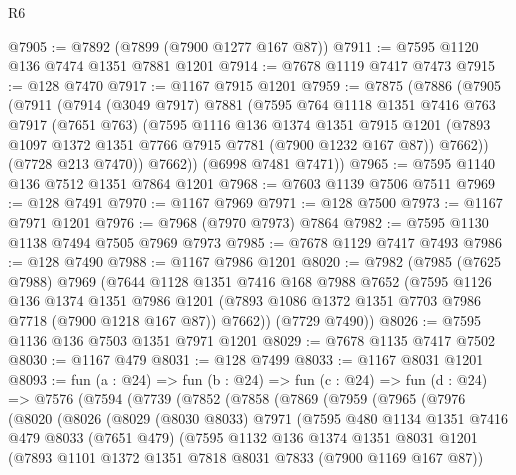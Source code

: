 \begin{lexlean}{R6}
\begin{coremodule}
@7905 := @7892 (@7899 (@7900 @1277 @167 @87))
@7911 := @7595 @1120 @136 @7474 @1351 @7881 @1201
@7914 := @7678 @1119 @7417 @7473
@7915 := @128 @7470
@7917 := @1167 @7915 @1201
@7959 := @7875
    (@7886
      (@7905
        (@7911
          (@7914
            (@3049 @7917)
            @7881
            (@7595
              @764
              @1118
              @1351
              @7416
              @763
              @7917
              (@7651 @763)
              (@7595
                @1116
                @136
                @1374
                @1351
                @7915
                @1201
                (@7893 @1097 @1372 @1351 @7766 @7915 @7781 (@7900 @1232 @167 @87))
                @7662))
            (@7728 @213 @7470))
          @7662))
      (@6998 @7481 @7471))
@7965 := @7595 @1140 @136 @7512 @1351 @7864 @1201
@7968 := @7603 @1139 @7506 @7511
@7969 := @128 @7491
@7970 := @1167 @7969
@7971 := @128 @7500
@7973 := @1167 @7971 @1201
@7976 := @7968 (@7970 @7973) @7864
@7982 := @7595 @1130 @1138 @7494 @7505 @7969 @7973
@7985 := @7678 @1129 @7417 @7493
@7986 := @128 @7490
@7988 := @1167 @7986 @1201
@8020 := @7982
    (@7985
      (@7625 @7988)
      @7969
      (@7644
        @1128
        @1351
        @7416
        @168
        @7988
        @7652
        (@7595
          @1126
          @136
          @1374
          @1351
          @7986
          @1201
          (@7893 @1086 @1372 @1351 @7703 @7986 @7718 (@7900 @1218 @167 @87))
          @7662))
      (@7729 @7490))
@8026 := @7595 @1136 @136 @7503 @1351 @7971 @1201
@8029 := @7678 @1135 @7417 @7502
@8030 := @1167 @479
@8031 := @128 @7499
@8033 := @1167 @8031 @1201
@8093 := fun (a : @24) =>
  fun (b : @24) =>
  fun (c : @24) =>
  fun (d : @24) =>
  @7576
    (@7594
      (@7739
        (@7852
          (@7858
            (@7869
              (@7959
                (@7965
                  (@7976
                    (@8020
                      (@8026
                        (@8029
                          (@8030 @8033)
                          @7971
                          (@7595
                            @480
                            @1134
                            @1351
                            @7416
                            @479
                            @8033
                            (@7651 @479)
                            (@7595
                              @1132
                              @136
                              @1374
                              @1351
                              @8031
                              @1201
                              (@7893 @1101 @1372 @1351 @7818 @8031 @7833 (@7900 @1169 @167 @87))

\end{coremodule}
\end{lexlean}
